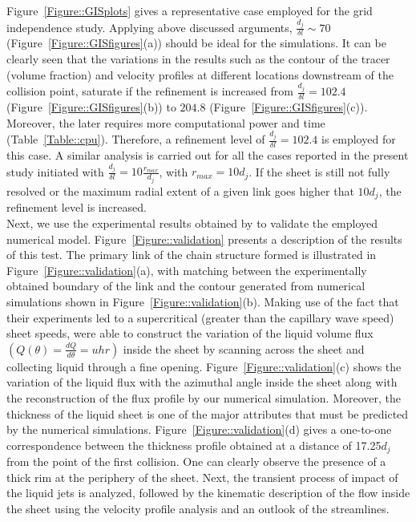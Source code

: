 \documentclass[%
aip,
sd,%
amsmath,amssymb,
preprint,%
author-year,%
]{revtex4-1}
\begin{document}
Figure~\ref{Figure::GISplots} gives a representative case employed for the grid independence study. Applying above discussed arguments, $\frac{d_j}{\delta l} \sim 70$ (Figure~\ref{Figure::GISfigures}(a)) should be ideal for the simulations. It can be  clearly seen that the variations in the results such as the contour of the tracer (volume fraction) and velocity profiles at different locations downstream of the collision point, saturate if the refinement is increased from $\frac{d_j}{\delta l} = 102.4$ (Figure~\ref{Figure::GISfigures}(b)) to $204.8$ (Figure~\ref{Figure::GISfigures}(c)). Moreover, the later requires more computational power and time (Table~\ref{Table::cpu}). Therefore, a refinement level of $\frac{d_j}{\delta l} = 102.4$ is employed for this case. A similar analysis is carried out for all the cases reported in the present study initiated with $\frac{d_j}{\delta l} = 10\frac{r_{max}}{d_j}$, with $r_{max} = 10d_j$. If the sheet is still not fully resolved or the maximum radial extent of a given link goes higher that $10d_j$, the refinement level is increased.\\
Next, we use the experimental results obtained by \cite{bush2004collision} to validate the employed numerical model. Figure~\ref{Figure::validation} presents a description of the results of this test. The primary link of the chain structure formed is illustrated in Figure~\ref{Figure::validation}(a), with matching between the experimentally obtained boundary of the link and the contour generated from numerical simulations shown in Figure~\ref{Figure::validation}(b). Making use of the fact that their experiments led to a supercritical (greater than the capillary wave speed) sheet speeds, \cite{bush2004collision} were able to construct the variation of the liquid volume flux $\left(Q(\theta) = \frac{dQ}{d\theta} = uhr\right)$ inside the sheet by scanning across the sheet and collecting liquid through a fine opening. Figure~\ref{Figure::validation}(c) shows the variation of the liquid flux with the azimuthal angle inside the sheet along with the reconstruction of the flux profile by our numerical simulation. Moreover, the thickness of the liquid sheet is one of the major attributes that must be predicted by the numerical simulations. Figure~\ref{Figure::validation}(d) gives a one-to-one correspondence between the thickness profile obtained at a distance of 17.25$d_j$ from the point of the first collision. One can clearly observe the presence of a thick rim at the periphery of the sheet. Next, the transient process of impact of the liquid jets is analyzed, followed by the kinematic description of the flow inside the sheet using the velocity profile analysis and an outlook of the streamlines. 
\end{document}
